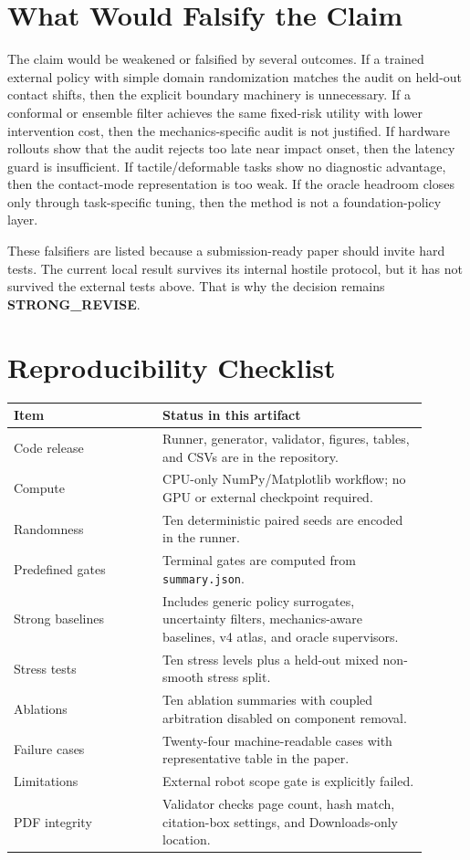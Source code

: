 \documentclass{article}
\newcommand{\terminal}{\textbf{STRONG\_REVISE}}
\begin{document}
\clearpage
\section{What Would Falsify the Claim}
The claim would be weakened or falsified by several outcomes. If a trained external policy with simple domain randomization matches the audit on held-out contact shifts, then the explicit boundary machinery is unnecessary. If a conformal or ensemble filter achieves the same fixed-risk utility with lower intervention cost, then the mechanics-specific audit is not justified. If hardware rollouts show that the audit rejects too late near impact onset, then the latency guard is insufficient. If tactile/deformable tasks show no diagnostic advantage, then the contact-mode representation is too weak. If the oracle headroom closes only through task-specific tuning, then the method is not a foundation-policy layer.

These falsifiers are listed because a submission-ready paper should invite hard tests. The current local result survives its internal hostile protocol, but it has not survived the external tests above. That is why the decision remains \terminal.

\clearpage
\section{Reproducibility Checklist}
\begin{longtable}{p{0.32\linewidth}p{0.58\linewidth}}
\toprule
Item & Status in this artifact \\
\midrule
Code release & Runner, generator, validator, figures, tables, and CSVs are in the repository. \\
Compute & CPU-only NumPy/Matplotlib workflow; no GPU or external checkpoint required. \\
Randomness & Ten deterministic paired seeds are encoded in the runner. \\
Predefined gates & Terminal gates are computed from \texttt{summary.json}. \\
Strong baselines & Includes generic policy surrogates, uncertainty filters, mechanics-aware baselines, v4 atlas, and oracle supervisors. \\
Stress tests & Ten stress levels plus a held-out mixed non-smooth stress split. \\
Ablations & Ten ablation summaries with coupled arbitration disabled on component removal. \\
Failure cases & Twenty-four machine-readable cases with representative table in the paper. \\
Limitations & External robot scope gate is explicitly failed. \\
PDF integrity & Validator checks page count, hash match, citation-box settings, and Downloads-only location. \\
\bottomrule
\end{longtable}
\end{document}
